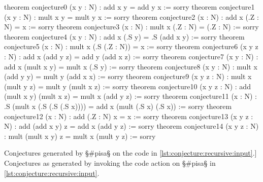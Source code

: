 \begin{listing}[H]
\begin{LeanCode}
theorem conjecture0 (x y : N)    : add x y = add y x := sorry
theorem conjecture1 (x y : N)    : mult x y = mult y x := sorry
theorem conjecture2 (x : N)      : add x (.Z : N) = x := sorry
theorem conjecture3 (x : N)      : mult x (.Z : N) = (.Z : N) := sorry
theorem conjecture4 (x y : N)    : add x (.S y) = .S (add x y) := sorry
theorem conjecture5 (x : N)      : mult x (.S (.Z : N)) = x := sorry
theorem conjecture6 (x y z : N)
  : add x (add y z) = add y (add x z) := sorry
theorem conjecture7 (x y : N)
  : add x (mult x y) = mult x (.S y) := sorry
theorem conjecture8 (x y : N)
  : mult x (add y y) = mult y (add x x) := sorry
theorem conjecture9 (x y z : N)
  : mult x (mult y z) = mult y (mult x z) := sorry
theorem conjecture10 (x y z : N)
  : add (mult x y) (mult x z) = mult x (add y z) := sorry
theorem conjecture11 (x : N)
  : .S (mult x (.S (.S (.S x)))) = add x (mult (.S x) (.S x)) := sorry
theorem conjecture12 (x : N)
  : add (.Z : N) x = x := sorry
theorem conjecture13 (x y z : N)
  : add (add x y) z = add x (add y z) := sorry
theorem conjecture14 (x y z : N)
  : mult (mult x y) z = mult x (mult y z) := sorry
\end{LeanCode}
\caption
  [Conjectures generated by §\#pisa§ on the code in \cref{lst:conjecture:recursive:input}.]
  {Conjectures as generated by invoking the code action on §\#pisa§ in \cref{lst:conjecture:recursive:input}.}
\label{lst:conjecture:recursive:output}
\end{listing}
